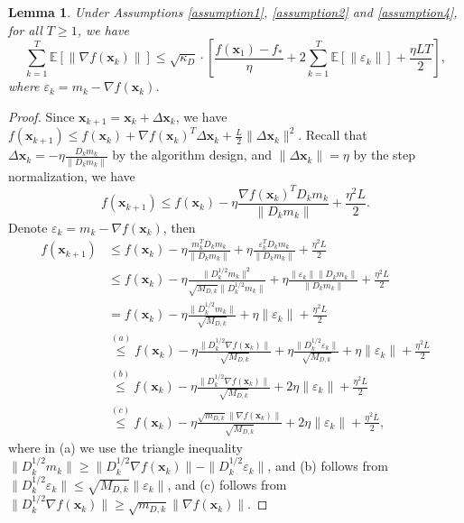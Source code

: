 \documentclass{article}
\newcommand{\bx}{\boldsymbol{x}}
\theoremstyle{plain}
\newtheorem{lemma}[theorem]{Lemma}
\theoremstyle{definition}
\theoremstyle{remark}
\begin{document}
\begin{lemma}\label{lemma:append1}
    Under Assumptions \ref{assumption1}, \ref{assumption2} and \ref{assumption4}, for all $T\geq 1$, we have
    \begin{equation*}
\sum_{k=1}^T\mathbb{E}\left[\|\nabla f(\bx_k)\|\right] 
\leq \sqrt{\kappa_D} \cdot \left[\frac{f(\bx_1) - f_{*}}{\eta}   + 2  \sum_{k=1}^T\mathbb{E}\left[\|\varepsilon_k\|\right] + \frac{\eta L T}{2}\right],
\end{equation*}
where $\varepsilon_k=m_k-\nabla f(\bx_k)$.
\end{lemma}

\begin{proof}
    Since $\bx_{k+1}=\bx_k + \Delta\bx_k$, we have $ f(\bx_{k+1}) \leq f(\bx_k)+\nabla f(\bx_k)^T\Delta\bx_k + \frac{L}{2}\|\Delta\bx_k\|^2$.
Recall that $\Delta\bx_k=-\eta \frac{D_km_k}{\|D_km_k\|}$ by the algorithm design, and $\|\Delta\bx_k\|=\eta$ by the step normalization, we have
\begin{equation*}
f(\bx_{k+1}) \leq f(\bx_k) - \eta \frac{\nabla f(\bx_k)^TD_km_k}{\|D_km_k\|} + \frac{\eta^2L}{2}.
\end{equation*}
Denote $\varepsilon_k=m_k-\nabla f(\bx_k)$, then
\begin{align*}
f(\bx_{k+1}) & \leq f(\bx_k) - \eta \frac{m_k^TD_km_k}{\|D_km_k\|} + \eta \frac{\varepsilon_k^TD_km_k}{\|D_km_k\|} + \frac{\eta^2L}{2} \\
& \leq f(\bx_k) - \eta \frac{\|D_k^{1/2}m_k\|^2}{\sqrt{M_{D,k}}\|D_k^{1/2}m_k\|} + \eta \frac{\|\varepsilon_k\| \|D_km_k\| }{\|D_km_k\|} + \frac{\eta^2L}{2} \\
& = f(\bx_k) - \eta \frac{\|D_k^{1/2}m_k\|}{\sqrt{M_{D,k}}} + \eta \|\varepsilon_k\|  + \frac{\eta^2L}{2} \\
& \stackrel{(a)}{\leq} f(\bx_k) - \eta \frac{\|D_k^{1/2}\nabla f(\bx_k)\|}{\sqrt{M_{D,k}}} + \eta \frac{\|D_k^{1/2}\varepsilon_k\|}{\sqrt{M_{D,k}}} + \eta \|\varepsilon_k\|  + \frac{\eta^2L}{2} \\
& \stackrel{(b)}{\leq} f(\bx_k) - \eta \frac{\|D_k^{1/2}\nabla f(\bx_k)\|}{\sqrt{M_{D,k}}} + 2\eta \|\varepsilon_k\|  + \frac{\eta^2 L}{2} \\
& \stackrel{(c)}{\leq} f(\bx_k) - \eta \frac{\sqrt{m_{D,k}}\|\nabla f(\bx_k)\|}{\sqrt{M_{D,k}}} + 2\eta \|\varepsilon_k\|  + \frac{\eta^2 L}{2},
\end{align*}
where in (a) we use the triangle inequality $\|D_k^{1/2}m_k\|\geq \|D_k^{1/2}\nabla f(\bx_k)\| - \|D_k^{1/2}\varepsilon_k\|$, and (b) follows from $\|D_k^{1/2}\varepsilon_k\| \leq \sqrt{M_{D,k}}\|\varepsilon_k\|$, and (c) follows from $\|D_k^{1/2}\nabla f(\bx_k)\| \geq \sqrt{m_{D,k}}\|\nabla f(\bx_k)\|$.


\end{proof}
\end{document}

